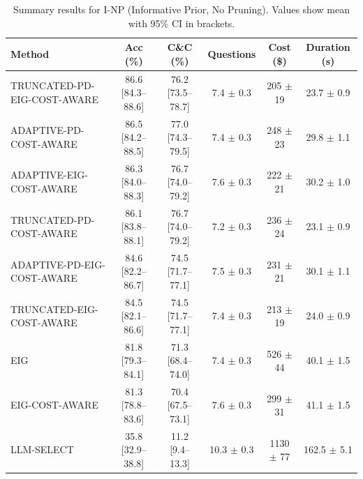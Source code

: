 \begin{table}[htbp]
\centering
\small
\caption{Summary results for I-NP (Informative Prior, No Pruning). Values show mean with 95\% CI in brackets.}
\label{tab:results-notprune_notuniform}
\begin{tabular}{@{}lccccc@{}}
\toprule
Method & Acc (\%) & C\&C (\%) & Questions & Cost (\$) & Duration (s) \\
\midrule
TRUNCATED-PD-EIG-COST-AWARE & 86.6 [84.3--88.6] & 76.2 [73.5--78.7] & 7.4 $\pm$ 0.3 & 205 $\pm$ 19 & 23.7 $\pm$ 0.9 \\
ADAPTIVE-PD-COST-AWARE & 86.5 [84.2--88.5] & 77.0 [74.3--79.5] & 7.4 $\pm$ 0.3 & 248 $\pm$ 23 & 29.8 $\pm$ 1.1 \\
ADAPTIVE-EIG-COST-AWARE & 86.3 [84.0--88.3] & 76.7 [74.0--79.2] & 7.6 $\pm$ 0.3 & 222 $\pm$ 21 & 30.2 $\pm$ 1.0 \\
TRUNCATED-PD-COST-AWARE & 86.1 [83.8--88.1] & 76.7 [74.0--79.2] & 7.2 $\pm$ 0.3 & 236 $\pm$ 24 & 23.1 $\pm$ 0.9 \\
ADAPTIVE-PD-EIG-COST-AWARE & 84.6 [82.2--86.7] & 74.5 [71.7--77.1] & 7.5 $\pm$ 0.3 & 231 $\pm$ 21 & 30.1 $\pm$ 1.1 \\
TRUNCATED-EIG-COST-AWARE & 84.5 [82.1--86.6] & 74.5 [71.7--77.1] & 7.4 $\pm$ 0.3 & 213 $\pm$ 19 & 24.0 $\pm$ 0.9 \\
EIG & 81.8 [79.3--84.1] & 71.3 [68.4--74.0] & 7.4 $\pm$ 0.3 & 526 $\pm$ 44 & 40.1 $\pm$ 1.5 \\
EIG-COST-AWARE & 81.3 [78.8--83.6] & 70.4 [67.5--73.1] & 7.6 $\pm$ 0.3 & 299 $\pm$ 31 & 41.1 $\pm$ 1.5 \\
LLM-SELECT & 35.8 [32.9--38.8] & 11.2 [9.4--13.3] & 10.3 $\pm$ 0.3 & 1130 $\pm$ 77 & 162.5 $\pm$ 5.1 \\
\bottomrule
\end{tabular}
\end{table}